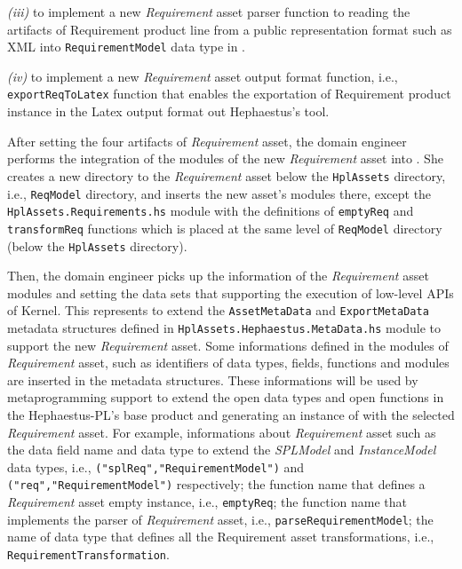 \textit{(iii)} to implement a new \textit{Requirement} asset parser function to reading the artifacts of Requirement product line from a public representation format such as XML into \texttt{RequirementModel} data type in \hpl.

\textit{(iv)} to implement a new \textit{Requirement} asset output format function, i.e., \texttt{exportReqToLatex} function that enables the exportation of Requirement product instance in the Latex output format out Hephaestus's tool.

After setting the four artifacts of \textit{Requirement} asset, the domain engineer performs the integration of the modules of the new \textit{Requirement} asset into \hpl. She creates a new directory to the \textit{Requirement} asset below the \texttt{HplAssets} directory, i.e., \texttt{ReqModel} directory, and inserts the new asset's modules there, except the \texttt{ HplAssets.Requirements.hs} module with the definitions of \texttt{emptyReq} and \texttt{transformReq} functions which is placed at the same level of \texttt{ReqModel} directory (below the \texttt{HplAssets} directory).

Then, the domain engineer picks up the information of the \textit{Requirement} asset modules and setting the data sets that supporting the execution of low-level APIs of \hpl{} Kernel. This represents to extend the \texttt{AssetMetaData} and \texttt{ExportMetaData} metadata structures defined in \texttt{HplAssets.Hephaestus.MetaData.hs} module to support the new \textit{Requirement} asset. 
Some informations defined in the modules of \textit{Requirement} asset, such as identifiers of data types, fields, functions and modules are inserted in the metadata structures. These informations will be used by metaprogramming support to extend the open data types and open functions in the Hephaestus-PL's base product and generating an instance of \hpl{} with the selected \textit{Requirement} asset. For example, informations about \textit{Requirement} asset such as the data field name and data type to extend the \textit{SPLModel} and \textit{InstanceModel} data types, i.e., \texttt{("splReq","RequirementModel")} and \texttt{("req","RequirementModel")} respectively; the function name that defines a \textit{Requirement} asset empty instance, i.e., \texttt{emptyReq}; the function name that implements the parser of \textit{Requirement} asset, i.e., \texttt{parseRequirementModel}; the name of data type that defines all the Requirement asset transformations, i.e., \texttt{RequirementTransformation}.

